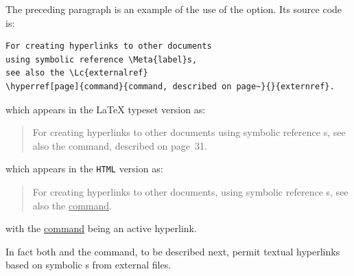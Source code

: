 \medskip\noindent
The preceding paragraph is an example of the use of the  option.
Its source code is:
\begin{small}
\begin{verbatim}
For creating hyperlinks to other documents
using symbolic reference \Meta{label}s, 
see also the \Lc{externalref} 
\hyperref[page]{command}{command, described on page~}{}{externref}.
\end{verbatim}
\end{small}
\begin{htmlonly}
which appears in the \LaTeX{} typeset version as:
\begin{quote}
For creating hyperlinks to other documents
using symbolic reference s, see also the
 command, described on page~31.
\end{quote}
\end{htmlonly}
\begin{latexonly}
which appears in the \texttt{HTML} version as:
\begin{quote}
For creating hyperlinks to other documents, using symbolic reference s, 
see also the  \underline{command}.
\end{quote}
with the \underline{command} being an active hyperlink.
\end{latexonly}
\smallskip\noindent
In fact both  and the  command, to be described next,
permit textual hyperlinks based on symbolic s from external files.


%

